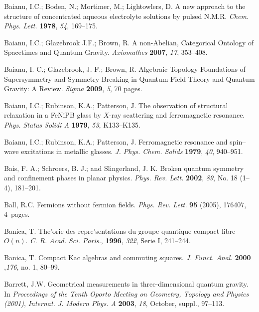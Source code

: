 \documentclass[12pt]{article}
\theoremstyle{plain}
\theoremstyle{definition}
\numberwithin{equation}{section}
\begin{document}
\begin{thebibliography}{199}
Baianu, I.C.; Boden, N.; Mortimer, M.; Lightowlers, D.  A new approach to the structure of concentrated aqueous electrolyte solutions by pulsed N.M.R. {\em Chem. Phys. Lett.}
{\bf 1978}, {\em 54}, 169--175.

Baianu, I.C.; Glazebrook J.F.; Brown, R.  A non-Abelian, Categorical Ontology of Spacetimes and Quantum Gravity. {\em Axiomathes}  {\bf 2007}, {\em 17}, 353--408.

Baianu, I. C.; Glazebrook, J. F.; Brown, R.  Algebraic Topology Foundations of Supersymmetry and Symmetry Breaking in Quantum Field Theory and Quantum Gravity: A Review.
{\em Sigma} {\bf 2009}, {\em 5}, 70 pages.

Baianu, I.C.; Rubinson,  K.A.; Patterson, J. The observation of structural relaxation in a FeNiPB glass by $X$-ray scattering and ferromagnetic resonance. {\em Phys. Status
Solidi A} {\bf 1979}, {\em 53}, K133--K135.

Baianu, I.C.; Rubinson,  K.A.;  Patterson, J. Ferromagnetic resonance and spin--wave excitations in metallic glasses. \emph{J. Phys. Chem. Solids} {\bf 1979}, {\em 40}, 940--951.

Bais, F. A.;  Schroers, B. J.; and  Slingerland, J. K.  Broken quantum symmetry and confinement phases in planar physics. \emph{Phys. Rev. Lett.} \textbf{2002}, {\em 89}, No. 18 (1--4), 181--201. 


Ball, R.C.  Fermions without fermion fields. {\em Phys. Rev. Lett.} \textbf{95} (2005), 176407, 4~pages.


Banica, T. The'orie des repre'sentations du groupe quantique compact libre $O(n)$. {\em  C. R. Acad. Sci. Paris.}, {\bf 1996}, {\em 322}, Serie I, 241--244.

Banica, T.  Compact Kac algebras and commuting squares. {\em J. Funct. Anal.}  {\bf 2000} ,{\em 176}, no. 1, 80--99.

Barrett, J.W.  Geometrical measurements in three-dimensional quantum gravity.  In {\em Proceedings of the Tenth Oporto Meeting on Geometry, Topology and Physics (2001)}, \textit{Internat. J. Modern Phys. A}  {\bf 2003}, {\em 18}, October, suppl., 97--113.  


\end{thebibliography}
\end{document}
